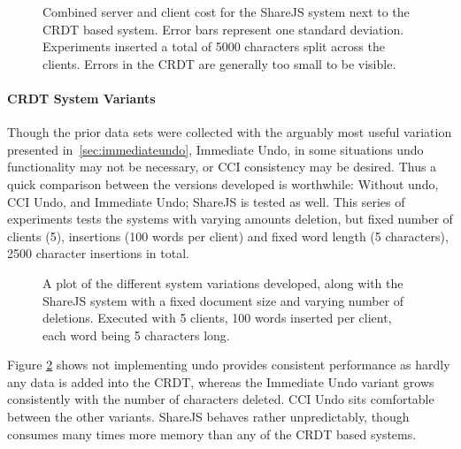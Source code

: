 \documentclass[12pt,a4paper,twoside,openright]{report}
\begin{document}
				\begin{figure}[htb]
					\centering
					
					\caption[Memory Consumption versus Replication] {Combined server and client cost for the ShareJS system next to the CRDT based system. Error bars represent one standard deviation. Experiments inserted a total of 5000 characters split across the clients. Errors in the CRDT are generally too small to be visible.}
					\label{fig:memvsreplication}
				\end{figure}
				
			\paragraph{CRDT System Variants}
				Though the prior data sets were collected with the arguably most useful variation presented in~\cref{sec:immediateundo}, Immediate Undo, in some situations undo functionality may not be necessary, or CCI consistency may be desired. Thus a quick comparison between the versions developed is worthwhile: Without undo, CCI Undo, and Immediate Undo; ShareJS is tested as well. This series of experiments tests the systems with varying amounts deletion, but fixed number of clients (5), insertions (100 words per client) and fixed word length (5 characters), 2500 character insertions in total.
				
				\begin{figure}[htb]
					\centering
					
					\caption[Behavior of System Variants - Memory] {A plot of the different system variations developed, along with the ShareJS system with a fixed document size and varying number of deletions. Executed with 5 clients, 100 words inserted per client, each word being 5 characters long.}
					\label{fig:variantsmemory}
				\end{figure}
				
				Figure \ref{fig:variantsmemory} shows not implementing undo provides consistent performance as hardly any data is added into the CRDT, whereas the Immediate Undo variant grows consistently with the number of characters deleted. CCI Undo sits comfortable between the other variants. ShareJS behaves rather unpredictably, though consumes many times more memory than any of the CRDT based systems.
				
\end{document}
